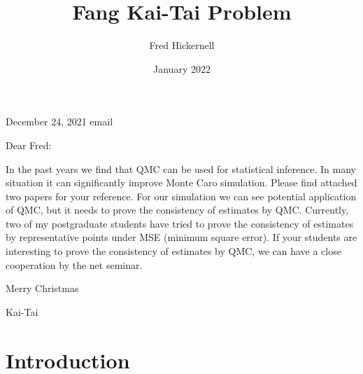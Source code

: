 \documentclass{article}
\title{Fang Kai-Tai Problem}
\author{Fred Hickernell}
\date{January 2022}
\begin{document}
\maketitle

December 24, 2021 email

Dear Fred:
 
In the past years we find that QMC can be used for statistical inference. In many situation it can significantly improve
Monte Caro simulation. Please find attached two papers for your reference.  For our simulation we can see potential 
application of QMC, but it needs to prove the consistency of estimates by QMC.  Currently, two of my postgraduate 
students have tried to prove the consistency of estimates by representative points under MSE (minimum square error).
If your students are interesting to prove the consistency of estimates by QMC, we can have a close cooperation by 
the net seminar. 

 Merry Christmas
 
 Kai-Tai

\section{Introduction}
\end{document}
